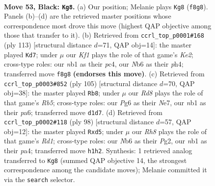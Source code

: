\documentclass[11pt]{article}
\begin{document}
\clearpage

\begin{figure}[p]\centering
\begin{subfigure}{0.46\textwidth}\centering
\resizebox{\linewidth}{!}{%
\newchessgame
\chessboard[
  setfen={5k2/5p1p/1n4p1/p3p1P1/P3P3/1P4RP/4K1P1/RN1r3r b - - 21 53},
  showmover=false,
  pgfstyle=straightmove, color=movearrow, markmove={f8-g8}
]}
\caption{}
\end{subfigure}\hfill
\begin{subfigure}{0.46\textwidth}\centering
\resizebox{\linewidth}{!}{%
\newchessgame
\chessboard[
  setfen={8/r3k3/3p2p1/3P1p2/r1PKpPpP/PRR3P1/8/8 b - - 3 57},
  showmover=false,
  pgfstyle=straightmove, color=movearrow, markmove={e7-d7}
]}
\caption{}
\end{subfigure}
\\[4pt]
\begin{subfigure}{0.46\textwidth}\centering
\resizebox{\linewidth}{!}{%
\newchessgame
\chessboard[
  setfen={8/r1k1n3/P2p1pp1/2pP4/1rN2P1p/2KR3P/1P4P1/R7 b - - 13 53},
  showmover=false,
  pgfstyle=straightmove, color=movearrow, markmove={b4-b8}
]}
\caption{}
\end{subfigure}\hfill
\begin{subfigure}{0.46\textwidth}\centering
\resizebox{\linewidth}{!}{%
\newchessgame
\chessboard[
  setfen={r1r3k1/6p1/4N1np/1P1p1p2/p1p4P/4P3/5PP1/R2R1K2 w - - 4 50},
  showmover=false,
  pgfstyle=straightmove, color=movearrow, markmove={d1-d5}
]}
\caption{}
\end{subfigure}
\caption{\textbf{Move 53, Black: \texttt{Kg8}.} (a) Our position; Melanie plays \texttt{Kg8} (\texttt{f8g8}). Panels (b)--(d) are the retrieved master positions whose correspondence most drove this move (highest QAP objective among those that transfer to it). (b) Retrieved from \texttt{ccrl\_top\_p0001\#168} (ply 113) [structural distance $d$=71, QAP obj=14]: the master played \texttt{Kd7}; under $\mu$ our \emph{Kf1} plays the role of that game's \emph{Ke2}; cross-type roles: our \emph{n}b1 as their \emph{p}c4, our \emph{N}b6 as their \emph{p}h4; transferred move \texttt{f8g8} \textbf{(endorses this move)}. (c) Retrieved from \texttt{ccrl\_top\_p0003\#852} (ply 105) [structural distance $d$=70, QAP obj=38]: the master played \texttt{Rb8}; under $\mu$ our \emph{Rd8} plays the role of that game's \emph{Rb5}; cross-type roles: our \emph{P}g6 as their \emph{N}e7, our \emph{n}b1 as their \emph{p}a6; transferred move \texttt{d1d7}. (d) Retrieved from \texttt{ccrl\_top\_p0002\#118} (ply 98) [structural distance $d$=57, QAP obj=12]: the master played \texttt{Rxd5}; under $\mu$ our \emph{Rh8} plays the role of that game's \emph{Rd1}; cross-type roles: our \emph{N}b6 as their \emph{P}g2, our \emph{n}b1 as their \emph{p}a4; transferred move \texttt{h1h2}. Synthesis: 1 retrieved analog transferred to \texttt{Kg8} (summed QAP objective 14, the strongest correspondence among the candidate moves); Melanie committed it via the \texttt{search} selector.}
\label{fig:thought-m105}
\end{figure}
\end{document}

